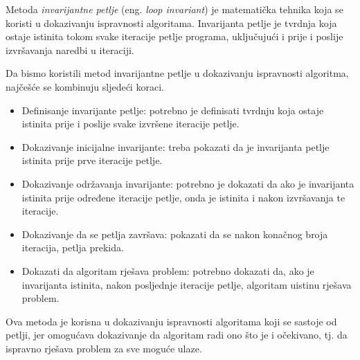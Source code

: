 Metoda \textit{invarijantne petlje} (eng. \textit{{loop} {invariant}}) je matematička tehnika koja se koristi u dokazivanju ispravnosti algoritama. Invarijanta petlje je tvrdnja koja ostaje istinita tokom svake iteracije petlje programa, uključujući i prije i poslije izvršavanja naredbi u iteraciji.

Da bismo koristili metod invarijantne petlje u dokazivanju ispravnosti algoritma, najčešće se kombinuju sljedeći koraci.

\begin{itemize}
	\item  Definisanje invarijante petlje: potrebno je definisati tvrdnju koja ostaje istinita prije i poslije svake izvršene iteracije petlje.
   \item Dokazivanje inicijalne invarijante: treba pokazati da je invarijanta petlje istinita prije prve iteracije petlje.
   \item Dokazivanje održavanja invarijante: potrebno je dokazati da ako je invarijanta istinita prije određene iteracije petlje, onda je istinita i nakon izvršavanja te iteracije.
   \item Dokazivanje da se petlja završava: pokazati da se nakon konačnog broja iteracija, petlja prekida.
   \item Dokazati da algoritam rješava problem: potrebno dokazati da, ako je invarijanta istinita, nakon posljednje iteracije petlje, algoritam uistinu rješava problem.
\end{itemize}

Ova metoda je korisna u dokazivanju ispravnosti algoritama koji se sastoje od petlji, jer omogućava dokazivanje da algoritam radi ono što je i očekivano, tj. da ispravno rješava problem za sve moguće ulaze.

